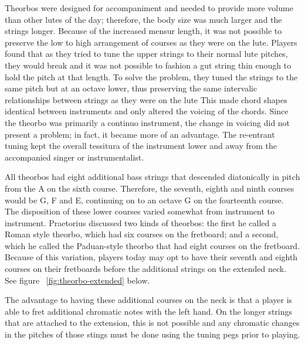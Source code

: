 Theorbos were designed for accompaniment and needed to provide more volume than other
lutes of the day; therefore, the body size was much larger and the strings longer.
Because of the increased mensur length, it was not possible to preserve the low to high
arrangement of courses as they were on the lute. Players found that as they tried to tune
the upper strings to their normal lute pitches, they would break and it was not
possible to fashion a gut string thin enough to hold the pitch at that length.  To solve
the problem, they tuned the strings to the same pitch but at an octave lower, thus
preserving the same intervalic relationships between strings as they were on the lute  This
made chord shapes identical between instruments and only altered the voicing of the
chords. Since the theorbo was primarily a continuo instrument, the change in voicing did
not present a problem; in fact, it became more of an advantage.  The re-entrant tuning
kept the overall tessitura of the instrument lower and away from the accompanied singer or
instrumentalist.

All theorbos had eight additional bass strings that descended diatonically in
pitch from the A on the sixth course.  Therefore, the seventh, eighth and ninth
courses would be G, F and E, continuing on to an octave G on the fourteenth
course.  The disposition of these lower courses varied somewhat from instrument
to instrument.  Praetorius discussed two kinds of theorbos: the first he called
a Roman style theorbo, which had six courses on the fretboard; and a second,
which he called the Paduan-style theorbo that had eight courses on the
fretboard. \autocite[59]{MP:1}  Because of this variation, players today may
opt to have their seventh and eighth courses on their fretboards before the
additional strings on the extended neck. See figure ~\ref{fig:theorbo-extended}
below.

The advantage to having these additional courses on the neck is that a player is
able to fret additional chromatic notes with the left hand.  On the longer
strings that are attached to the extension, this is not possible and any
chromatic changes in the pitches of those stings must be done using the tuning
pegs prior to playing.

